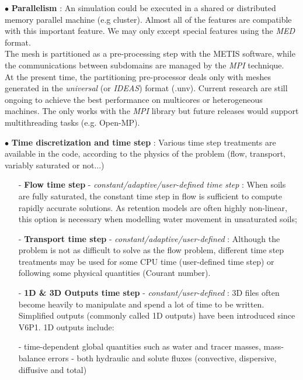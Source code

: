\begin{list}{-}{}
% 
\vspace{5pt}
%
\item[$\bullet$] \textbf{Parallelism} :
%
An \estel simulation could be executed in a shared or distributed memory parallel machine (e.g cluster).
Almost all of the \estel features are compatible with this important feature.
We may only except special features using the \textit{MED} format. \\
The mesh is partitioned as a pre-processing step with the METIS software,
while the communications between subdomains are managed by the \textit{MPI} technique.\\
At the present time, the partitioning pre-processor deals only with meshes generated in the \textit{universal} (or \textit{IDEAS}) format (.unv).
Current research are still ongoing to achieve the best performance on multicores or heterogeneous machines.
The \estel \rel only works with the \textit{MPI} library but future releases would support multithreading tasks (e.g. Open-MP).
%
\vspace{5pt}
%
\item[$\bullet$] \textbf{Time discretization and time step} :
% 
Various time step treatments are available in the code,
according to the physics of the problem (flow, transport, variably saturated or not...)
\begin{itemize}
\item[-] {\bf Flow time step} - \textit{constant/adaptive/user-defined time step} : When soils are fully saturated, the constant time step in flow is sufficient to compute rapidly accurate solutions.
As retention models are often highly non-linear, this option is necessary when modelling water movement in unsaturated soils;
\item[-] {\bf Transport time step} - \textit{constant/adaptive/user-defined} : Although the problem is not as difficult to solve as the flow problem,
different time step treatments may be used for some CPU time (user-defined time step) or following some physical quantities (Courant number).
\item[-] {\bf 1D \& 3D Outputs time step} - \textit{constant/user-defined} : 3D files often become heavily to manipulate and spend a lot of time to be written.
Simplified outputs (commonly called 1D outputs) have been introduced since \estel V6P1. 1D outputs include:
\begin{list}
 - time-dependent global quantities such as water and tracer masses, mass-balance errors
 - both hydraulic and solute fluxes (convective, dispersive, diffusive and total)

\end{list}
\end{itemize}
\end{list}
